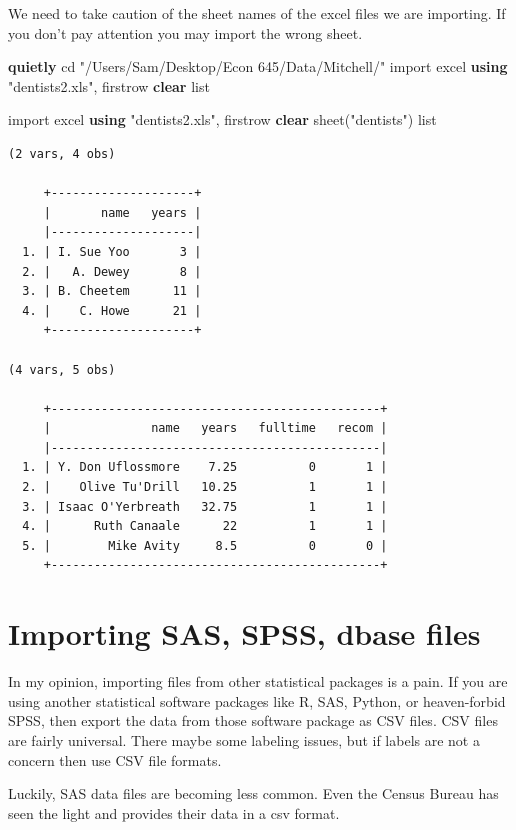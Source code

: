 \documentclass[
]{book}
\newenvironment{Shaded}{\begin{snugshade}}{\end{snugshade}}
\newcommand{\KeywordTok}[1]{\textcolor[rgb]{0.13,0.29,0.53}{\textbf{#1}}}
\newcommand{\NormalTok}[1]{#1}
\newcommand{\OtherTok}[1]{\textcolor[rgb]{0.56,0.35,0.01}{#1}}
\newcommand{\StringTok}[1]{\textcolor[rgb]{0.31,0.60,0.02}{#1}}
\begin{document}
We need to take caution of the sheet names of the excel files we are importing. If you don't pay attention you may import the wrong sheet.

\begin{Shaded}
\begin{Highlighting}[]
\KeywordTok{quietly}\NormalTok{ cd }\StringTok{"/Users/Sam/Desktop/Econ 645/Data/Mitchell/"}
\NormalTok{import excel }\KeywordTok{using} \StringTok{"dentists2.xls"}\NormalTok{, firstrow }\KeywordTok{clear}
\OtherTok{list}

\NormalTok{import excel }\KeywordTok{using} \StringTok{"dentists2.xls"}\NormalTok{, firstrow }\KeywordTok{clear}\NormalTok{ sheet(}\StringTok{"dentists"}\NormalTok{)}
\OtherTok{list}
\end{Highlighting}
\end{Shaded}

\begin{verbatim}
(2 vars, 4 obs)

     +--------------------+
     |       name   years |
     |--------------------|
  1. | I. Sue Yoo       3 |
  2. |   A. Dewey       8 |
  3. | B. Cheetem      11 |
  4. |    C. Howe      21 |
     +--------------------+

(4 vars, 5 obs)

     +----------------------------------------------+
     |              name   years   fulltime   recom |
     |----------------------------------------------|
  1. | Y. Don Uflossmore    7.25          0       1 |
  2. |    Olive Tu'Drill   10.25          1       1 |
  3. | Isaac O'Yerbreath   32.75          1       1 |
  4. |      Ruth Canaale      22          1       1 |
  5. |        Mike Avity     8.5          0       0 |
     +----------------------------------------------+
\end{verbatim}

\section{Importing SAS, SPSS, dbase files}\label{importing-sas-spss-dbase-files}

In my opinion, importing files from other statistical packages is a pain. If you are using another statistical software packages like R, SAS, Python, or heaven-forbid SPSS, then export the data from those software package as CSV files. CSV files are fairly universal. There maybe some labeling issues, but if labels are not a concern then use CSV file formats.

Luckily, SAS data files are becoming less common. Even the Census Bureau has seen the light and provides their data in a csv format.
\end{document}
